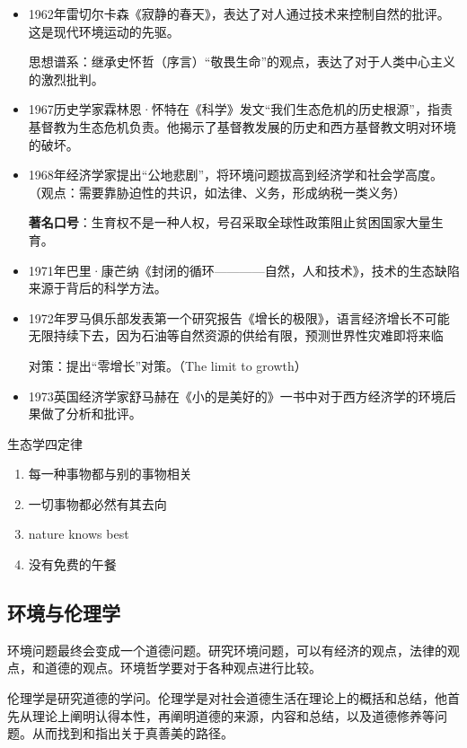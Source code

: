 \documentclass{ctexart}
\begin{document}
\begin{itemize}
    \item 1962年雷切尔卡森《寂静的春天》，表达了对人通过技术来控制自然的批评。这是现代环境运动的先驱。
    
    思想谱系：继承史怀哲（序言）“敬畏生命”的观点，表达了对于人类中心主义的激烈批判。
    \item 1967历史学家霖林恩·怀特在《科学》发文“我们生态危机的历史根源”，指责基督教为生态危机负责。他揭示了基督教发展的历史和西方基督教文明对环境的破坏。
    \item 1968年经济学家提出“公地悲剧”，将环境问题拔高到经济学和社会学高度。（观点：需要靠胁迫性的共识，如法律、义务，形成纳税一类义务）
    
    \textbf{著名口号}：生育权不是一种人权，号召采取全球性政策阻止贫困国家大量生育。
    \item 1971年巴里·康芒纳《封闭的循环————自然，人和技术》，技术的生态缺陷来源于背后的科学方法。
    \item 1972年罗马俱乐部发表第一个研究报告《增长的极限》，语言经济增长不可能无限持续下去，因为石油等自然资源的供给有限，预测世界性灾难即将来临
    
    对策：提出“零增长”对策。（The limit to growth）
    \item 1973英国经济学家舒马赫在《小的是美好的》一书中对于西方经济学的环境后果做了分析和批评。
\end{itemize}

\begin{fancybox}{生态学四定律}
    \begin{enumerate}
        \item 每一种事物都与别的事物相关
        \item 一切事物都必然有其去向
        \item nature knows best
        \item 没有免费的午餐
    \end{enumerate}
\end{fancybox}

\subsection{环境与伦理学}

环境问题最终会变成一个道德问题。研究环境问题，可以有经济的观点，法律的观点，和道德的观点。环境哲学要对于各种观点进行比较。

伦理学是研究道德的学问。伦理学是对社会道德生活在理论上的概括和总结，他首先从理论上阐明认得本性，再阐明道德的来源，内容和总结，以及道德修养等问题。从而找到和指出关于真善美的路径。
\end{document}
